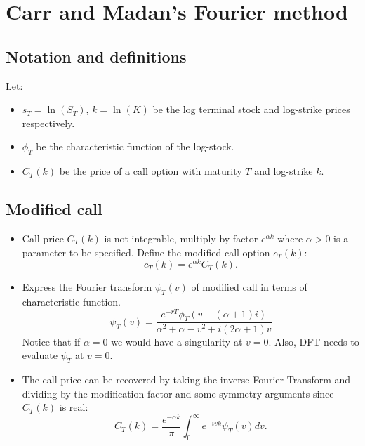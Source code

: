 \documentclass[11pt]{article}
\begin{document}
		\section{Carr and Madan's Fourier method}
			\subsection{Notation and definitions}
			Let:
			\begin{itemize}
				\item	\( s_{T} = \ln(S_T) \), \( k = \ln(K) \) be the log terminal stock and  log-strike prices respectively.
				\item	\( \phi_{T} \) be the characteristic function of the log-stock.
				\item \( C_{T}(k) \) be the price of a call option with maturity \( T \) and log-strike \( k \).
			\end{itemize}
			\subsection{Modified call}
			\begin{itemize}
				\item Call price \( C_{T}(k) \) is not integrable, multiply by factor \( e^{\alpha k} \) where \( \alpha >0 \) is a parameter to be specified. Define the modified call option \( c_{T}(k) \):
				\[		c_{T}(k) = e^{\alpha k}C_{T}(k).
						\]
				\item Express the Fourier transform \( \psi_{T}(v) \) of modified call in terms of characteristic function.
				\[		\psi_{T}(v) = \frac{e^{-rT}\phi_{T}(v - (\alpha + 1)i)}{\alpha^{2} + \alpha - v^2 + i(2\alpha + 1)v}
						\]
				Notice that if \( \alpha = 0 \) we would have a singularity at \( v = 0 \). Also, DFT needs to evaluate \( \psi_{T} \) at \( v = 0 \).
				\item The call price can be recovered by taking the inverse Fourier Transform and dividing by the modification factor and some symmetry arguments since \( C_{T}(k) \) is real:
					\[	C_{T}(k) = \frac{e^{-\alpha k}}{\pi}\int_{0}^{\infty}e^{-ivk}\psi_{T}(v)dv.
							\]	
				\end{itemize}
\end{document}
